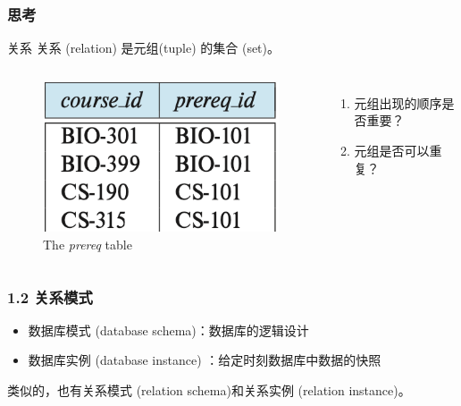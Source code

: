 \documentclass[aspectratio=169, 14pt]{beamer}
\begin{document}
\begin{frame}
    \frametitle{思考}
\begin{block}{关系}
    关系 (relation) 是元组(tuple) 的集合 (set)。
\end{block}
    
\begin{columns}
    \begin{figure}
        \includegraphics[height=.35\paperheight]{table/prereq}
        \caption*{The \emph{prereq} table} 
    \end{figure}
    \begin{enumerate}
        \item 元组出现的顺序是否重要？
        \item 元组是否可以重复？
    \end{enumerate}
\end{columns}

\end{frame}

\begin{frame}
    \frametitle{1.2 关系模式}
\begin{itemize}
    \item 数据库模式 (database schema)：数据库的逻辑设计
    \item 数据库实例 (database instance) ：给定时刻数据库中数据的快照
\end{itemize}
    类似的，也有关系模式 (relation schema)和关系实例 (relation instance)。

\end{frame}
\end{document}
